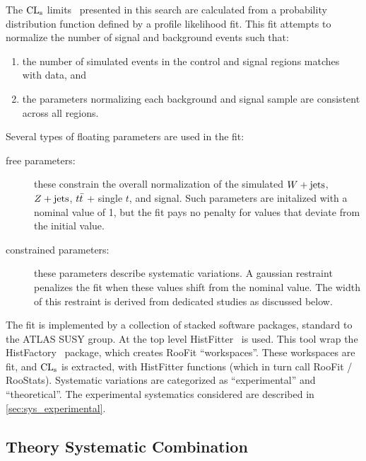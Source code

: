 The $\mathrm{CL}_{\mathrm{s}}$ limits~\cite{cls} presented in this search are calculated
from a probability distribution function defined by a
 profile likelihood
fit. This fit attempts to normalize the number of signal and background
events such that:
\begin{enumerate}
\item the number of simulated events in the control and signal regions
  matches with data, and
\item the parameters normalizing each background and signal sample are
  consistent across all regions.
\end{enumerate}
Several types of floating parameters are used in the fit:
\begin{description}
\item[free parameters:] these constrain the
  overall normalization of the simulated $W + \text{jets}$,
  $Z + \text{jets}$, $t \bar{t}$ + single $t$, and
  signal. Such parameters are initalized with a nominal value of 1,
  but the fit pays no penalty for values that deviate from the initial
  value.
\item[constrained parameters:] these
  parameters describe systematic variations. A gaussian restraint
  penalizes the fit when these values shift from the nominal
  value. The width of this restraint is derived from dedicated
  studies as discussed below.
\end{description}

The fit is implemented by a collection of stacked software packages,
standard to the ATLAS SUSY group. At the top level
HistFitter~\cite{histfitter} is used. This tool wrap the
HistFactory~\cite{histfactory} package, which creates RooFit
``workspaces''. These workspaces are fit, and $\mathrm{CL}_{\mathrm{s}}$ is extracted, with
HistFitter functions (which in turn call RooFit /
RooStats). Systematic variations are categorized as ``experimental''
and ``theoretical''. The experimental systematics considered are described in \cref{sec:sys_experimental}.

\subsection{Theory Systematic Combination}

